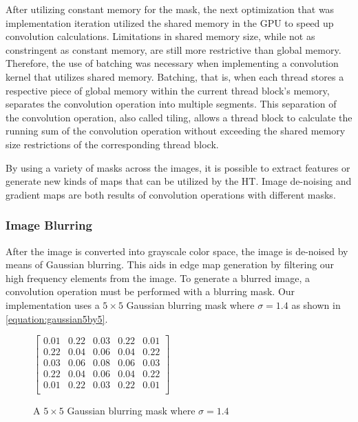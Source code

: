 \documentclass[conference]{IEEEtran}
\begin{document}
After utilizing constant memory for the mask, the next optimization that was implementation iteration utilized the shared memory in the GPU to speed up convolution calculations.
Limitations in shared memory size, while not as constringent as constant memory, are still more restrictive than global memory.
Therefore, the use of batching was necessary when implementing a convolution kernel that utilizes shared memory. 
Batching, that is, when each thread stores a respective piece of global memory within the current thread block's memory, separates the convolution operation into multiple segments.
This separation of the convolution operation, also called tiling, allows a thread block to calculate the running sum of the convolution operation without exceeding the shared memory size restrictions of the corresponding thread block.















By using a variety of masks across the images, it is possible to extract features or generate new kinds of maps that can be utilized by the HT\@.
Image de-noising and gradient maps are both results of convolution operations with different masks.

\subsubsection{Image Blurring}
After the image is converted into grayscale color space, the image is de-noised by means of Gaussian blurring.
This aids in edge map generation by filtering our high frequency elements from the image.
To generate a blurred image, a convolution operation must be performed with a blurring mask. 
Our implementation uses a $5 \times 5$ Gaussian blurring mask where $\sigma = 1.4$ as shown in \autoref{equation:gaussian5by5}.


\begin{figure}[h] %
  \centering
  $\begin{bmatrix}
  0.01 & 0.22 & 0.03 & 0.22 & 0.01 \\
  0.22 & 0.04 & 0.06 & 0.04 & 0.22 \\
  0.03 & 0.06 & 0.08 & 0.06 & 0.03 \\
  0.22 & 0.04 & 0.06 & 0.04 & 0.22 \\
  0.01 & 0.22 & 0.03 & 0.22 & 0.01 \\
\end{bmatrix}$\caption{A $5 \times 5$ Gaussian blurring mask where $\sigma = 1.4$}\label{equation:gaussian5by5}
\end{figure}
\end{document}
